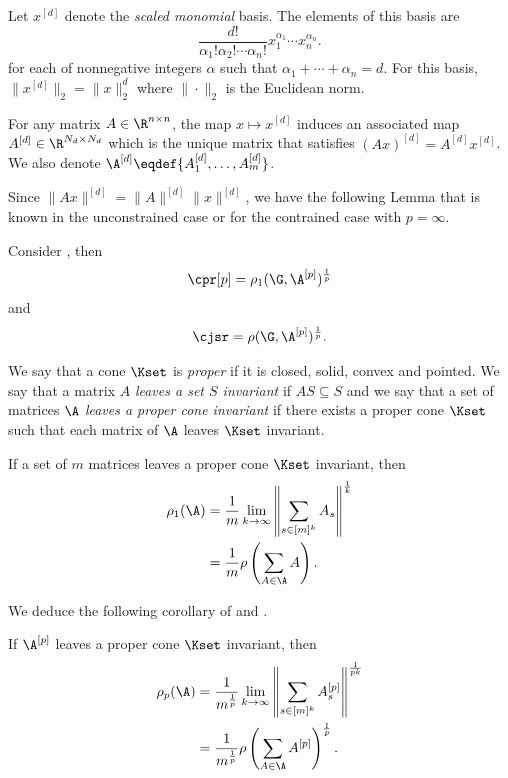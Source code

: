 Let $x^{[d]}$ denote the \emph{scaled monomial} basis.
The elements of this basis are
\[ \frac{d!}{\alpha_1!\alpha_2!\cdots\alpha_n!} x_1^{\alpha_1} \cdots x_n^{\alpha_n}. \]
for each  of nonnegative integers $\alpha$ such that
$\alpha_1 + \cdots + \alpha_n = d$.
For this basis, $\|x^{[d]}\|_2 = \|x\|_2^d$ where $\|\cdot\|_2$ is the Euclidean norm.


For any matrix $A \in \R^{n \times n}$, the map $x \mapsto x^{[d]}$ induces an
associated map $A^{[d]} \in \R^{N_d \times N_d}$ which is the unique
matrix that satisfies $(Ax)^{[d]} = A^{[d]}x^{[d]}$.
We also denote $\A^{[d]} \eqdef \{A_1^{[d]}, \ldots, A_m^{[d]}\}$.

Since $\|Ax\|^{[d]} = \|A\|^{[d]}\|x\|^{[d]}$, we have the following
Lemma that is known in the unconstrained case or for the contrained
case with $p=\infty$.
\begin{lemma}
  \label{lem:pp}
  Consider , then
  \[ \cpr[p] = \rho_1(\G,\A^{[p]})^{\frac{1}{p}} \]
  and
  \[ \cjsr = \rho(\G,\A^{[p]})^{\frac{1}{p}}. \]
\end{lemma}

We say that a cone $\Kset$ is \emph{proper} if it is closed, solid, convex and pointed.
We say that a matrix $A$ \emph{leaves a set $S$ invariant} if $AS \subseteq S$ and
we say that a set of matrices $\A$ \emph{leaves a proper cone invariant} if there
exists a proper cone $\Kset$ such that each matrix of $\A$ leaves $\Kset$ invariant.

\begin{lemma}
  \label{lem:unconstrainedinv}
  If a set of $m$ matrices leaves a proper cone $\Kset$ invariant, then
  \begin{align*}
    \rho_1(\A)
    & = \frac{1}{m}\lim_{k\to\infty} \left\|\sum_{s \in [m]^k}A_s\right\|^{\frac{1}{k}}\\
    & = \frac{1}{m}\rho\left(\sum_{A \in \A}A\right).
  \end{align*}
\end{lemma}


We deduce the following corollary of  and
.
\begin{corollary}
  If $\A^{[p]}$ leaves a proper cone $\Kset$ invariant, then
  \begin{align*}
    \rho_p(\A)
    & = \frac{1}{m^{\frac{1}{p}}}\lim_{k\to\infty} \left\|\sum_{s \in [m]^k}A_s^{[p]}\right\|^{\frac{1}{pk}}\\
    & = \frac{1}{m^{\frac{1}{p}}}\rho\left(\sum_{A \in \A}A^{[p]}\right)^{\frac{1}{p}}.
  \end{align*}
\end{corollary}


